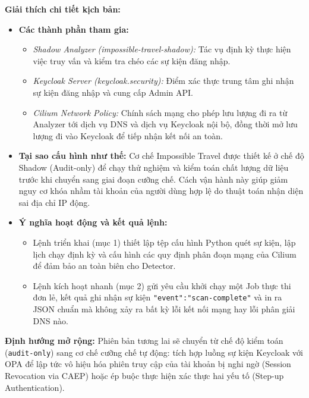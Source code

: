 \textbf{Giải thích chi tiết kịch bản:}
\begin{itemize}[itemsep=4pt, parsep=0pt]
    \item \textbf{Các thành phần tham gia:}
    \begin{itemize}
        \item \textit{Shadow Analyzer (impossible-travel-shadow):} Tác vụ định kỳ thực hiện việc truy vấn và kiểm tra chéo các sự kiện đăng nhập.
        \item \textit{Keycloak Server (keycloak.security):} Điểm xác thực trung tâm ghi nhận sự kiện đăng nhập và cung cấp Admin API.
        \item \textit{Cilium Network Policy:} Chính sách mạng cho phép lưu lượng đi ra từ Analyzer tới dịch vụ DNS và dịch vụ Keycloak nội bộ, đồng thời mở lưu lượng đi vào Keycloak để tiếp nhận kết nối an toàn.
    \end{itemize}
    \item \textbf{Tại sao cấu hình như thế:} Cơ chế Impossible Travel được thiết kế ở chế độ Shadow (Audit-only) để chạy thử nghiệm và kiểm toán chất lượng dữ liệu trước khi chuyển sang giai đoạn cưỡng chế. Cách vận hành này giúp giảm nguy cơ khóa nhầm tài khoản của người dùng hợp lệ do thuật toán nhận diện sai địa chỉ IP động.
    \item \textbf{Ý nghĩa hoạt động và kết quả lệnh:} 
    \begin{itemize}
        \item Lệnh triển khai (mục 1) thiết lập tệp cấu hình Python quét sự kiện, lập lịch chạy định kỳ và cấu hình các quy định phân đoạn mạng của Cilium để đảm bảo an toàn biên cho Detector.
        \item Lệnh kích hoạt nhanh (mục 2) gửi yêu cầu khởi chạy một Job thực thi đơn lẻ, kết quả ghi nhận sự kiện \texttt{"event":"scan-complete"} và in ra JSON chuẩn mà không xảy ra bất kỳ lỗi kết nối mạng hay lỗi phân giải DNS nào.
    \end{itemize}
\end{itemize}

\textbf{Định hướng mở rộng:} Phiên bản tương lai sẽ chuyển từ chế độ kiểm toán (\texttt{audit-only}) sang cơ chế cưỡng chế tự động: tích hợp luồng sự kiện Keycloak với OPA để lập tức vô hiệu hóa phiên truy cập của tài khoản bị nghi ngờ (Session Revocation via CAEP) hoặc ép buộc thực hiện xác thực hai yếu tố (Step-up Authentication).


